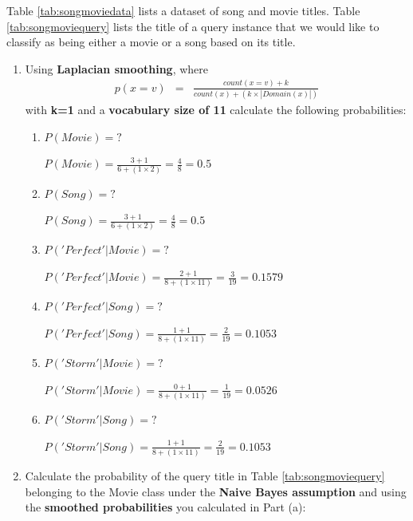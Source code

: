 \documentclass[--SOLUTION-OPTION--]{ditpaper}
\begin{document}
\question Table \ref{tab:songmoviedata} lists a dataset of song and movie titles. Table \ref{tab:songmoviequery} lists the title of a query instance that we would like to classify as being either a movie or a song based on its title. 
	\begin{enumerate}
		\item Using \textbf{Laplacian smoothing}, where 
		\begin{eqnarray*}
		p(x=v) &=& \frac{count(x=v)+k}{count(x) +( k \times |Domain(x)|)}
		\end{eqnarray*}
		with \textbf{k=1} and a \textbf{vocabulary size of 11} calculate the following probabilities:
			\begin{enumerate}
				\item $P(Movie)=?$
					\begin{answer}
						$P(Movie) = \frac{3+1}{6 + (1 \times 2)} = \frac{4}{8} = 0.5$
					\end{answer}
				\item $P(Song)=?$
					\begin{answer}
						$P(Song) = \frac{3+1}{6 + (1 \times 2)} = \frac{4}{8} = 0.5$
					\end{answer}
				\item $P('Perfect'|Movie)=?$
					\begin{answer}
						$P('Perfect'| Movie) = \frac{2+1}{8 + (1 \times 11)} = \frac{3}{19} = 0.1579$
					\end{answer}
				\item $P('Perfect'|Song)=?$
					\begin{answer}
						$P('Perfect'|Song) = \frac{1+1}{8 + (1 \times 11)} = \frac{2}{19} = 0.1053$
					\end{answer}
				\item $P('Storm'|Movie)=?$
					\begin{answer}
						$P('Storm'|Movie) = \frac{0+1}{8 + (1 \times 11)} = \frac{1}{19} = 0.0526$
					\end{answer}
				\item $P('Storm'|Song)=?$
					\begin{answer}
						$P('Storm'|Song) = \frac{1+1}{8 + (1 \times 11)} = \frac{2}{19} = 0.1053$
					\end{answer}
			\end{enumerate}
		\item Calculate the probability of the query title in Table \ref{tab:songmoviequery} belonging to the Movie class under the \textbf{Naive Bayes assumption} and using the \textbf{smoothed probabilities} you calculated in Part (a):		

\end{enumerate}
\end{document}
